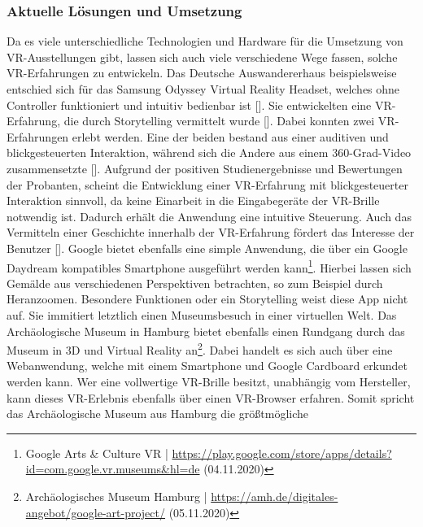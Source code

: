 \documentclass[a4paper,12pt,oneside]{article}
\begin{document}
      \subsubsection{Aktuelle Lösungen und Umsetzung} \label{Aktuelle Lösungen und Umsetzung}
        Da es viele unterschiedliche Technologien und Hardware für die Umsetzung von 
        VR-Ausstellungen 
        gibt, lassen sich auch viele verschiedene Wege fassen, solche VR-Erfahrungen 
        zu entwickeln.
        Das Deutsche Auswandererhaus beispielsweise entschied sich für das Samsung Odyssey
        Virtual Reality Headset, welches ohne Controller funktioniert und intuitiv
        bedienbar ist [\cite[35]{Heidsiek2019}]. Sie entwickelten eine VR-Erfahrung, die
        durch Storytelling vermittelt wurde [\cite[35-39]{Heidsiek2019}]. Dabei
        konnten zwei VR-Erfahrungen erlebt werden. Eine der beiden bestand aus einer 
        auditiven und
        blickgesteuerten Interaktion, während sich die Andere aus 
        einem 360-Grad-Video zusammensetzte [\cite[38]{Heidsiek2019}].
        Aufgrund der positiven Studienergebnisse und Bewertungen der Probanten, scheint
        die Entwicklung einer VR-Erfahrung mit blickgesteuerter Interaktion sinnvoll, da
        keine Einarbeit in die Eingabegeräte der VR-Brille notwendig ist. Dadurch erhält
        die Anwendung eine intuitive Steuerung. Auch das Vermitteln einer Geschichte 
        innerhalb der VR-Erfahrung fördert das Interesse der Benutzer [\cite[35-39]{Heidsiek2019}].
        Google bietet ebenfalls eine simple Anwendung, die über ein Google Daydream
        kompatibles Smartphone ausgeführt werden kann\footnote{Google Arts \& Culture VR | \url{https://play.google.com/store/apps/details?id=com.google.vr.museums&hl=de} (04.11.2020)}.
        Hierbei lassen sich Gemälde aus verschiedenen Perspektiven betrachten, so zum 
        Beispiel durch Heranzoomen.
        Besondere Funktionen oder ein Storytelling weist diese App nicht auf. Sie immitiert
        letztlich einen Museumsbesuch in einer virtuellen Welt.
        Das Archäologische Museum in Hamburg bietet ebenfalls einen Rundgang durch
        das Museum in 3D und Virtual Reality an\footnote{Archäologisches Museum Hamburg | \url{https://amh.de/digitales-angebot/google-art-project/} (05.11.2020)}.
        Dabei handelt es sich auch über eine Webanwendung, welche mit einem Smartphone und
        Google Cardboard erkundet werden kann. Wer eine vollwertige VR-Brille besitzt,
        unabhängig vom Hersteller, kann dieses VR-Erlebnis ebenfalls über einen VR-Browser
        erfahren. Somit spricht das Archäologische Museum aus Hamburg die größtmögliche 
\end{document}
